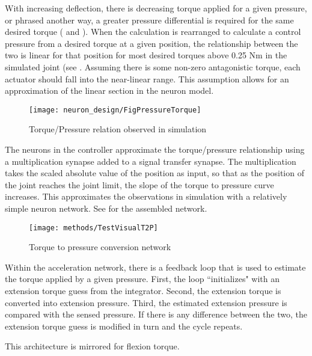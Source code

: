 With increasing deflection, there is decreasing torque applied for a given
pressure, or phrased another way, a greater pressure differential is required
for the same desired torque ( and ). When the calculation is rearranged to calculate
a control pressure from a desired torque at a given position, the relationship
between the two is linear for that position for most desired torques above
0.25 Nm in the simulated joint (see . Assuming there is some non-zero antagonistic
torque, each actuator should fall into the near-linear range. This assumption allows for
an approximation of the linear section in the neuron model.

\begin{figure}
\centering
\texttt{[image: neuron\_design/FigPressureTorque]}
\caption{Torque/Pressure relation observed in simulation}
\label{fig:PressureTorque}
\end{figure}

The neurons in the controller approximate the torque/pressure relationship using a multiplication synapse added
to a signal transfer synapse. The multiplication takes the scaled absolute 
value of the position as input, so that as the position of the joint reaches
the joint limit, the slope of the torque to pressure curve increases. This
approximates the observations in simulation with a relatively simple neuron
network. See  for the assembled network.

\begin{figure}
\centering
\texttt{[image: methods/TestVisualT2P]}
\caption{Torque to pressure conversion network}
\label{fig:T2PNetwork}
\end{figure}


Within the acceleration network, there is a feedback loop that is used to 
estimate the torque applied by a given pressure. First, the loop ``initializes"
with an extension torque guess from the integrator. Second, the extension
torque is converted into extension pressure. Third, the estimated extension
pressure is compared with the sensed pressure. If there is any difference between the
two, the extension torque guess is modified in turn and the cycle repeats.

This architecture is mirrored for flexion torque.


